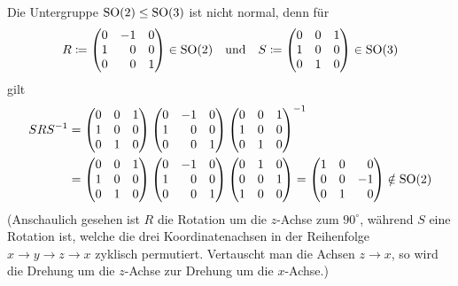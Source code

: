 Die Untergruppe $\operatorname{SO}(2) \leq \operatorname{SO}(3)$ ist nicht normal, denn für
\[
            R
  \coloneqq \begin{pmatrix*}[r]
              0 & -1  & 0 \\
              1 &  0  & 0 \\
              0 &  0  & 1
            \end{pmatrix*}
  \in       \sorthogonal{2}
  \quad\text{und}\quad
            S
  \coloneqq \begin{pmatrix}
              0 & 0 & 1 \\
              1 & 0 & 0 \\
              0 & 1 & 0
            \end{pmatrix}
  \in       \sorthogonal{3}
\]
gilt
\begin{align*}
          S R S^{-1}
  &=      \begin{pmatrix}
            0 & 0 & 1 \\
            1 & 0 & 0 \\
            0 & 1 & 0
          \end{pmatrix}
          \begin{pmatrix*}[r]
            0 & -1  & 0 \\
            1 &  0  & 0 \\
            0 &  0  & 1
          \end{pmatrix*}
          \begin{pmatrix}
            0 & 0 & 1 \\
            1 & 0 & 0 \\
            0 & 1 & 0
          \end{pmatrix}^{-1}
  \\
  &=      \begin{pmatrix}
            0 & 0 & 1 \\
            1 & 0 & 0 \\
            0 & 1 & 0
          \end{pmatrix}
          \begin{pmatrix*}[r]
            0 & -1  & 0 \\
            1 &  0  & 0 \\
            0 &  0  & 1
          \end{pmatrix*}
          \begin{pmatrix}
            0 & 1 & 0 \\
            0 & 0 & 1 \\
            1 & 0 & 0
          \end{pmatrix}
   =      \begin{pmatrix*}[r]
            1 & 0 &  0  \\
            0 & 0 & -1  \\
            0 & 1 &  0
          \end{pmatrix*}
   \notin \sorthogonal{2}
\end{align*}
(Anschaulich gesehen ist $R$ die Rotation um die $z$-Achse zum $90^\circ$, während $S$ eine Rotation ist, welche die drei Koordinatenachsen in der Reihenfolge $x \to y \to z \to x$ zyklisch permutiert.
Vertauscht man die Achsen $z \to x$, so wird die Drehung um die $z$-Achse zur Drehung um die $x$-Achse.)

